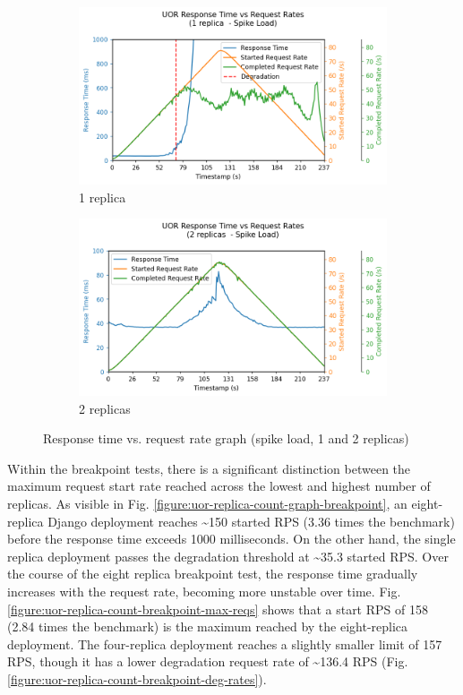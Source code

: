 \begin{figure}[h]
    \centering
    \begin{subfigure}{.5\textwidth}
      \centering
      \includegraphics[width=\linewidth]{figures/uor-replica-count-i1-graph.png}
      \caption{1 replica}
    \end{subfigure}%
    \begin{subfigure}{.5\textwidth}
      \centering
      \includegraphics[width=\linewidth]{figures/uor-replica-count-i2-graph.png}
      \caption{2 replicas}
    \end{subfigure}

    \caption{Response time vs. request rate graph (spike load, 1 and 2 replicas)}
    \label{figure:uor-replica-count-graph2}
\end{figure}

Within the breakpoint tests, there is a significant distinction between the maximum request start rate reached across the lowest and highest number of replicas. As visible in Fig. \ref{figure:uor-replica-count-graph-breakpoint}, an eight-replica Django deployment reaches \textasciitilde150 started RPS (3.36 times the benchmark) before the response time exceeds 1000 milliseconds. On the other hand, the single replica deployment passes the degradation threshold at \textasciitilde35.3 started RPS. Over the course of the eight replica breakpoint test, the response time gradually increases with the request rate, becoming more unstable over time. Fig. \ref{figure:uor-replica-count-breakpoint-max-reqs} shows that a start RPS of 158 (2.84 times the benchmark) is the maximum reached by the eight-replica deployment. The four-replica deployment reaches a slightly smaller limit of 157 RPS, though it has a lower degradation request rate of \textasciitilde136.4 RPS (Fig. \ref{figure:uor-replica-count-breakpoint-deg-rates}).

